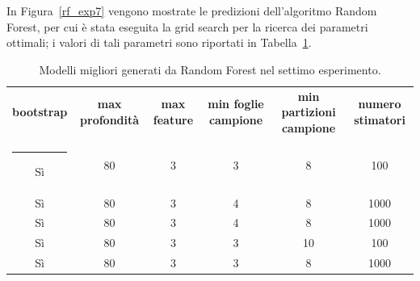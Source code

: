 \documentclass[12pt]{report}
\makeatletter
\theoremstyle{definition}
\newcommand{\thickhline}{%
    \noalign {\ifnum 0=`}\fi \hrule height 1pt
    \futurelet \reserved@a \@xhline
}
\makeatother
\begin{document}
In Figura~\ref{rf_exp7} vengono mostrate le predizioni dell'algoritmo Random Forest, per cui è stata eseguita la grid search per la ricerca dei parametri ottimali; i valori di tali parametri sono riportati in Tabella~\ref{models_rf_exp7}.

\begin{table}
\centering
\begin{adjustbox}{max width=\textwidth}
 \begin{tabular}{|c|c|c|c|c|c|} 
 \hline
\textbf{bootstrap} & \textbf{max profondità} & \textbf{max feature} & \textbf{min foglie campione} & \textbf{min partizioni campione} & \textbf{numero stimatori}
\\ [0.5ex] 
 \thickhline
 Sì & 80 & 3 & 3 & 8 & 100 \\ 
 Sì & 80 & 3 & 4 & 8 & 1000 \\ 
 Sì & 80 & 3 & 4 & 8 & 1000 \\ 
 Sì & 80 & 3 & 3 & 10 & 100 \\ 
 Sì & 80 & 3 & 3 & 8 & 1000 \\ 
 \hline
\end{tabular}
\end{adjustbox}
\caption{Modelli migliori generati da Random Forest nel settimo esperimento.}
\label{models_rf_exp7}
\end{table}
\end{document}
